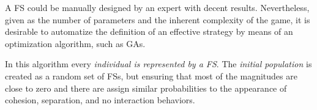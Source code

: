 \documentclass[a4paper]{llncs}
\begin{document}
%

A FS could be manually designed by an expert with decent results. Nevertheless, given as the number of parameters and the inherent complexity of the game, it is desirable to automatize the definition of an effective strategy by means of an optimization algorithm, such as GAs. 

In this algorithm every \textit{individual is represented by a FS}. The \textit{initial population} is created as a random set of FSs, but ensuring that most of the magnitudes are close to zero and there are assign similar probabilities to the appearance of cohesion, separation, and no interaction behaviors.
\end{document}
